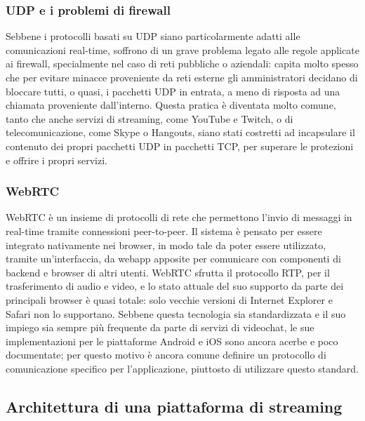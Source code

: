 		\subsubsection{UDP e i problemi di firewall}
			Sebbene i protocolli basati su UDP siano particolarmente adatti alle comunicazioni real-time, soffrono di un grave problema legato alle regole applicate ai firewall, specialmente nel caso di reti pubbliche o aziendali: capita molto spesso che per evitare minacce proveniente da reti esterne gli amministratori decidano di bloccare tutti, o quasi, i pacchetti UDP in entrata, a meno di risposta ad una chiamata proveniente dall'interno. Questa pratica è diventata molto comune, tanto che anche servizi di streaming, come YouTube e Twitch, o di telecomunicazione, come Skype o Hangouts, siano stati costretti ad incapsulare il contenuto dei propri pacchetti UDP in pacchetti TCP, per superare le protezioni e offrire i propri servizi.

		\subsubsection{WebRTC}
			WebRTC è un insieme di protocolli di rete che permettono l'invio di messaggi in real-time tramite connessioni peer-to-peer. Il sistema è pensato per essere integrato nativamente nei browser, in modo tale da poter essere utilizzato, tramite un'interfaccia, da webapp apposite per comunicare con componenti di backend e browser di altri utenti. WebRTC sfrutta il protocollo RTP, per il trasferimento di audio e video, e lo stato attuale del suo supporto da parte dei principali browser è quasi totale: solo vecchie versioni di Internet Explorer e Safari non lo supportano. Sebbene questa tecnologia sia standardizzata e il suo impiego sia sempre più frequente da parte di servizi di videochat, le sue implementazioni per le piattaforme Android e iOS sono ancora acerbe e poco documentate; per questo motivo è ancora comune definire un protocollo di comunicazione specifico per l'applicazione, piuttosto di utilizzare questo standard.

	\subsection{Architettura di una piattaforma di streaming}
